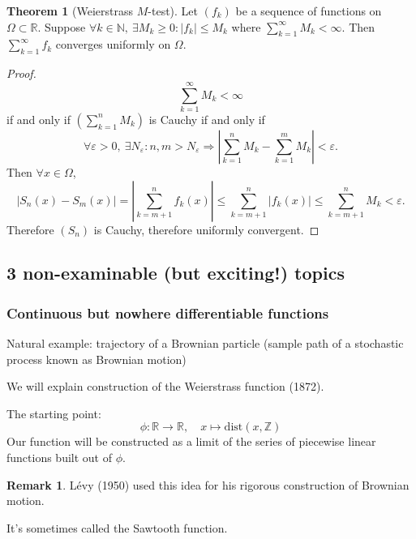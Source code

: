 \documentclass[a4paper]{article}
\newcommand{\dist}{\text{dist}}
\theoremstyle{definition}
\newtheorem{thm}[defn]{Theorem}
\newtheorem*{remark}{Remark}
\begin{document}
\begin{thm}[Weierstrass $M$-test]
Let $(f_k)$ be a sequence of functions on $\Omega \subset \mathbb R$. Suppose $\forall k\in \mathbb N,\ \exists M_k \geq 0 : |f_k|\leq M_k$ where $\sum_{k=1}^\infty M_k < \infty$. Then $\sum_{k=1}^\infty f_k$ converges uniformly on $\Omega$.
\end{thm}
\begin{proof}
\[
\sum_{k=1}^\infty M_k < \infty
\]
if and only if $\displaystyle \left(\sum_{k=1}^n M_k \right)$ is Cauchy if and only if
\[
\forall \varepsilon>0,\ \exists N_\varepsilon : n,m>N_\varepsilon \Rightarrow \left|\sum_{k=1}^n M_k - \sum_{k=1}^m M_k \right|<\varepsilon .
\]
Then $\forall x\in \Omega$,
\[
|S_n(x) - S_m(x)| =\left|\sum_{k=m+1}^n f_k(x)\right| \leq \sum_{k=m+1}^n |f_k(x)| \leq \sum_{k=m+1}^n M_k <\varepsilon .
\]
Therefore $(S_n)$ is Cauchy, therefore uniformly convergent.
\end{proof}

\subsection{3 non-examinable (but exciting!) topics}
\subsubsection{Continuous but nowhere differentiable functions}
Natural example: trajectory of a Brownian particle (sample path of a stochastic process known as Brownian motion)

We will explain construction of the Weierstrass function (1872).

The starting point:
\[
\phi: \mathbb R \rightarrow \mathbb R,\quad x\mapsto \dist (x,\mathbb Z)
\]
Our function will be constructed as a limit of the series of piecewise linear functions built out of $\phi$.
\begin{remark}
Lévy (1950) used this idea for his rigorous construction of Brownian motion.
\end{remark}
\begin{center}
\end{center}
It's sometimes called the Sawtooth function.
\end{document}
